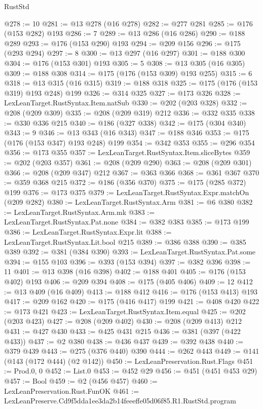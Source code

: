 \begin{lexlean}{RustStd}
\begin{coremodule}
@278 := 10
@281 := @13 @278 (@16 @278)
@282 := @277 @281
@285 := @176 (@153 @282) @193
@286 := 7
@289 := @13 @286 (@16 @286)
@290 := @188 @289
@293 := @176 (@153 @290) @193
@294 := @209 @156
@296 := @175 (@293 @294)
@297 := 8
@300 := @13 @297 (@16 @297)
@301 := @188 @300
@304 := @176 (@153 @301) @193
@305 := 5
@308 := @13 @305 (@16 @305)
@309 := @188 @308
@314 := @175 (@176 (@153 @309) @193 @255)
@315 := 6
@318 := @13 @315 (@16 @315)
@319 := @188 @318
@325 := @175 (@176 (@153 @319) @193 @248) @199
@326 := @314 @325
@327 := @173 @326
@328 := LexLeanTarget.RustSyntax.Item.natSub
@330 := @202 (@203 @328)
@332 := @208 (@209 @309)
@335 := @208 (@209 @319) @212
@336 := @332 @335
@338 := @330 @336 @215
@340 := @186 (@327 @338)
@342 := @175 (@304 @340)
@343 := 9
@346 := @13 @343 (@16 @343)
@347 := @188 @346
@353 := @175 (@176 (@153 @347) @193 @248) @199
@354 := @342 @353
@355 := @296 @354
@356 := @173 @355
@357 := LexLeanTarget.RustSyntax.Item.sliceBytes
@359 := @202 (@203 @357)
@361 := @208 (@209 @290)
@363 := @208 (@209 @301)
@366 := @208 (@209 @347) @212
@367 := @363 @366
@368 := @361 @367
@370 := @359 @368 @215
@372 := @186 (@356 @370)
@375 := @175 (@285 @372) @199
@376 := @173 @375
@379 := LexLeanTarget.RustSyntax.Expr.matchOn (@209 @282)
@380 := LexLeanTarget.RustSyntax.Arm
@381 := @6 @380
@382 := LexLeanTarget.RustSyntax.Arm.mk
@383 := LexLeanTarget.RustSyntax.Pat.none
@384 := @382 @383
@385 := @173 @199
@386 := LexLeanTarget.RustSyntax.Expr.lit
@388 := LexLeanTarget.RustSyntax.Lit.bool @215
@389 := @386 @388
@390 := @385 @389
@392 := @381 (@384 @390)
@393 := LexLeanTarget.RustSyntax.Pat.some
@394 := @155 @103
@396 := @393 (@153 @394)
@397 := @382 @396
@398 := 11
@401 := @13 @398 (@16 @398)
@402 := @188 @401
@405 := @176 (@153 @402) @193
@406 := @209 @394
@408 := @175 (@405 @406)
@409 := 12
@412 := @13 @409 (@16 @409)
@413 := @188 @412
@416 := @176 (@153 @413) @193
@417 := @209 @162
@420 := @175 (@416 @417) @199
@421 := @408 @420
@422 := @173 @421
@423 := LexLeanTarget.RustSyntax.Item.equal
@425 := @202 (@203 @423)
@427 := @208 (@209 @402)
@430 := @208 (@209 @413) @212
@431 := @427 @430
@433 := @425 @431 @215
@436 := @381 (@397 (@422 @433))
@437 := @2 @380
@438 := @436 @437
@439 := @392 @438
@440 := @379 @439
@443 := @275 (@376 @440) @390
@444 := @262 @443
@449 := @141 (@143 (@172 @444) (@2 @142))
@450 := LexLeanPreservation.Rust.Flags
@451 := Prod.{0, 0}
@452 := List.{0}
@453 := @452 @29
@456 := @451 (@451 @453 @29)
@457 := Bool
@459 := @2 (@456 @457)
@460 := LexLeanPreservation.Rust.FunOK
@461 := LexLeanPreserve.Cd9f5dda1ee3da2b14feeeffe05d06f85.R1.RustStd.program

\end{coremodule}
\end{lexlean}
